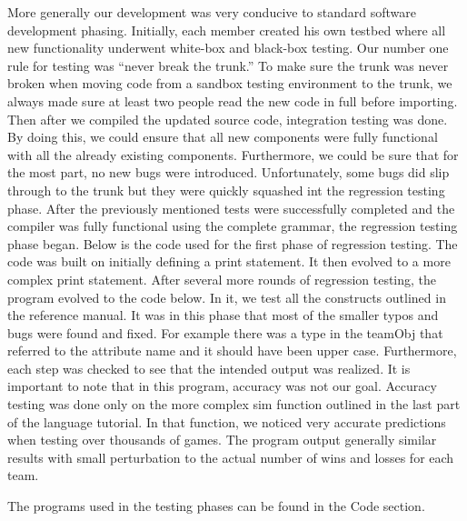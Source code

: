More generally our development was very conducive to standard software
development phasing.  Initially, each member created his own testbed
where all new functionality underwent white-box and black-box testing.
Our number one rule for testing was ``never break the trunk.''  To
make sure the trunk was never broken when moving code from a sandbox
testing environment to the trunk, we always made sure at least two
people read the new code in full before importing.  Then after we
compiled the updated source code, integration testing was done.  By
doing this, we could ensure that all new components were fully
functional with all the already existing components.  Furthermore, we
could be sure that for the most part, no new bugs were introduced.
Unfortunately, some bugs did slip through to the trunk but they were
quickly squashed int the regression testing phase.  After the
previously mentioned tests were successfully completed and the
compiler was fully functional using the complete grammar, the
regression testing phase began.  Below is the code used for the first
phase of regression testing.  The code was built on initially defining
a print statement.  It then evolved to a more complex print statement.
After several more rounds of regression testing, the program evolved
to the code below.  In it, we test all the constructs outlined in the
reference manual.  It was in this phase that most of the smaller typos
and bugs were found and fixed.  For example there was a type in the
teamObj that referred to the attribute name and it should have been
upper case.  Furthermore, each step was checked to see that the
intended output was realized.  It is important to note that in this
program, accuracy was not our goal.  Accuracy testing was done only on
the more complex sim function outlined in the last part of the
language tutorial.  In that function, we noticed very accurate
predictions when testing over thousands of games.  The program output
generally similar results with small perturbation to the actual number
of wins and losses for each team.  

The programs used in the testing phases can be found in the Code
section.
